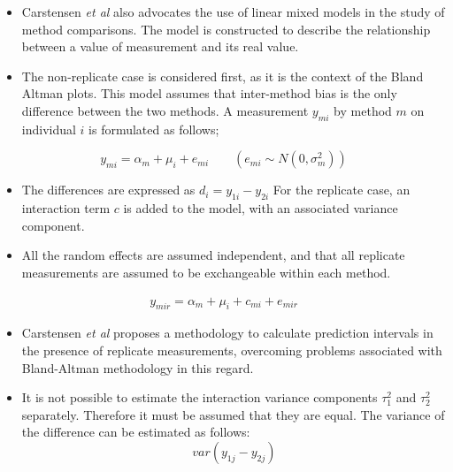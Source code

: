 \documentclass[compress]{beamer}        %
\begin{document}
\begin{frame}
\Large
\begin{itemize}
\item Carstensen \textit{et al} \cite{BXC2004} also advocates the use of linear mixed models in
the study of method comparisons. The model is constructed to
describe the relationship between a value of measurement and its
real value.
\item  The non-replicate case is considered first, as it is
the context of the Bland Altman plots. This model assumes that
inter-method bias is the only difference between the two methods.
A measurement $y_{mi}$ by method $m$ on individual $i$ is
formulated as follows;
\end{itemize}
\begin{equation}
y_{mi}  = \alpha_{m} + \mu_{i} + e_{mi} \qquad ( e_{mi} \sim
N(0,\sigma^{2}_{m}))
\end{equation}

\end{frame}
\begin{frame}
\Large
\begin{itemize}
\item The differences are expressed as $d_{i} = y_{1i} - y_{2i}$ For the
replicate case, an interaction term $c$ is added to the model,
with an associated variance component. 
\item All the random effects are
assumed independent, and that all replicate measurements are
assumed to be exchangeable within each method.
\end{itemize}
\begin{eqnarray}
y_{mir}  = \alpha_{m} + \mu_{i} + c_{mi} + e_{mir} 
\end{eqnarray}

\end{frame}

\begin{frame}
\Large
\begin{itemize}
\item Carstensen \textit{et al} \cite{BXC2008} proposes a methodology to calculate prediction
intervals in the presence of replicate measurements, overcoming
problems associated with Bland-Altman methodology in this regard.
\item It is not possible to estimate the interaction variance components
$\tau^{2}_{1}$ and $\tau^{2}_{2}$ separately. Therefore it must be
assumed that they are equal. The variance of the difference can be
estimated as follows:
\begin{equation}
var(y_{1j}-y_{2j})
\end{equation}
\end{itemize}
\end{frame}
\end{document}
